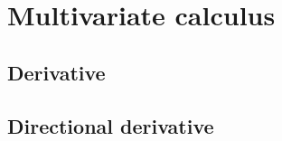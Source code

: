 \chapter{Multivariate calculus}

\section{Derivative}
\label{sec:derivative}

\section{Directional derivative}
\label{sec:directional_derivative}

 

